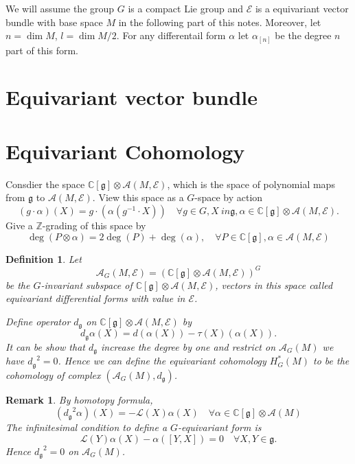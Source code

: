 \documentclass[11pt]{amsart}
\newtheorem{Def}[Thm]{Definition}
\newtheorem{Rmk}[Thm]{Remark}
\def\cA{{\mathcal{A}}}
\def\cAg{{\mathcal{A}_G}}
\def\cL{{\mathcal{L}}}
\def\cE{{\mathcal{E}}}
\def\bC{{\mathbb{C}}}
\def\fgg{{\mathfrak{g}}}
\def\bZ{{\mathbb{Z}}}
\def\dg{{d_{\fgg}}}
\begin{document}
We will assume the group $G$ is a compact Lie group and $\cE$ is a
equivariant vector bundle with base space $M$  in the following part
of this notes. Moreover, let $n=\dim M$, $l = \dim M/2$.
For any differentail form $\alpha$ let $\alpha_{[n]}$ be the degree
$n$ part of this form.

\section{Equivariant vector bundle}


\section{Equivariant Cohomology}

Consdier the space $\bC[\fgg]\otimes \cA(M,\cE)$, which is the space of polynomial maps from $\fgg$ to $\cA(M,\cE)$. View this space as a $G$-space by action
\[
(g\cdot \alpha)(X) = g\cdot (\alpha (g^{-1}\cdot X)) \quad \forall g\in G,
X\ in \fgg, \alpha \in \bC[\fgg]\otimes \cA(M,\cE).
\]
Give a $\bZ$-grading of this space by 
\[
\deg(P\otimes \alpha) = 2\deg(P)+\deg(\alpha), 
\quad \forall P\in \bC[\fgg], \alpha \in \cA(M,\cE)
\]

\begin{Def}
Let 
\[
\cA_G(M,\cE) = \left(\bC[\fgg]\otimes \cA(M,\cE)\right)^G
\]
be the $G$-invariant subspace of $\bC[\fgg]\otimes \cA(M,\cE)$, vectors in this space called equivariant differential forms with value in $\cE$.

Define operator $\dg$ on $\bC[\fgg]\otimes \cA(M,\cE)$ by
\[
\dg \alpha(X) = d(\alpha(X)) - \tau(X)(\alpha(X)).
\]
It can be show that $\dg$ increase the degree by one and restrict on 
$\cAg(M)$ we have $\dg^2= 0$. Hence we can define
the equivariant cohomology $H_G^*(M)$ to be the cohomology of complex $\left(\cAg(M),\dg\right)$.
\end{Def}

\begin{Rmk}
By homotopy formula,
\[
(\dg^2 \alpha)(X) = - \cL(X)\alpha(X)\quad \forall \alpha
\in \bC[\fgg]\otimes \cA(M)
\]
The infinitesimal condition to define a $G$-equivariant form is 
\[
\cL(Y)\alpha(X) - \alpha([Y,X]) = 0 \quad \forall X,Y \in \fgg.
\]
Hence $\dg^2 = 0$ on $\cAg(M)$.
\end{Rmk}
\end{document}
